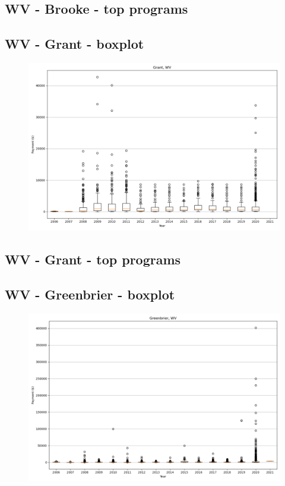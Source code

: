 \subsection*{WV - Brooke - top programs}

\newpage
\subsection*{WV - Grant - boxplot}
\begin{figure}[h]
\centering
\includegraphics[width=7in]{../output/boxplots/counties/Grant-WV_boxplot.png}
\end{figure}


\subsection*{WV - Grant - top programs}

\newpage
\subsection*{WV - Greenbrier - boxplot}
\begin{figure}[h]
\centering
\includegraphics[width=7in]{../output/boxplots/counties/Greenbrier-WV_boxplot.png}
\end{figure}


